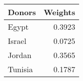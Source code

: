 \begin{tabular}{lr}
\toprule
 Donors &  Weights \\
\midrule
  Egypt &   0.3923 \\
 Israel &   0.0725 \\
 Jordan &   0.3565 \\
Tunisia &   0.1787 \\
\bottomrule
\end{tabular}

